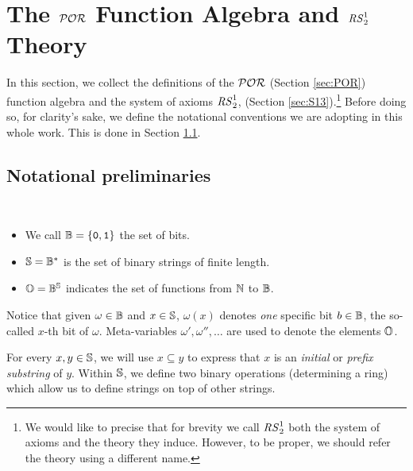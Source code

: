 \section{The $\mathcal{POR}$ Function Algebra and ${\mathit{RS}^1_2}$ Theory}
\label{sec:PORandLpw}

In this section, we collect the definitions of the
$\mathcal{POR}$ (Section \ref{sec:POR}) function algebra and the system of axioms ${\mathit{RS}^1_2}$,
(Section \ref{sec:S13}).\footnote{
We would like to precise that for brevity we call ${\mathit{RS}^1_2}$ both the system of axioms
and the theory they induce. However, to be proper, we should refer the theory using a different name.
} Before doing so, for clarity's sake,
we define the notational conventions we are adopting in this whole work.
This is done in Section \ref{sec:notation}.


\subsection{Notational preliminaries}\label{sec:notation}

\begin{defn}[Sets]~
  \begin{itemize}
  \item We call $\mathbb{B}=\{\mathtt{0},\mathtt{1}\}$ the set of bits.
  \item $\mathbb{S}=\mathbb{B}^*$
  is the set of binary strings of finite
  length.
  \item $\mathbb{O}=\mathbb{B}^{\mathbb{S}}$
    indicates the set of functions from $\mathbb{N}$ to $\mathbb{B}$.
  \end{itemize}
\end{defn}

Notice that given $\omega\in \mathbb{B}$ and $x \in \mathbb{S}$,
$\omega(x)$ denotes \emph{one}
specific bit $b \in \mathbb{B}$,
the so-called $x$-th bit of $\omega$.
Meta-variables $\omega',\omega'',\dots$
are used to denote the elements $\mathbb{O}$.

For every $x,y \in \mathbb{S}$,
we will use $x \subseteq y$
to express that $x$ is an \emph{initial} or
\emph{prefix substring} of $y$.
%
%
%
Within $\mathbb{S}$, we define two binary operations
(determining a ring) which allow us to define
strings on top of other strings.


